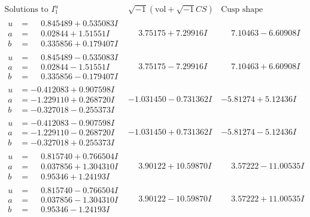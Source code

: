 \documentclass[1p]{elsarticle_modified}
\theoremstyle{definition}
\newcommand{\I}{\sqrt{-1}}
\begin{document}
$$\begin{array}{c|c|c}  
\text{Solutions to }I^u_{1}& \I (\text{vol} + \sqrt{-1}CS) & \text{Cusp shape}\\
 \hline 
\begin{aligned}
u &= \phantom{-}0.845489 + 0.535083 I \\
a &= \phantom{-}0.02844 + 1.51551 I \\
b &= \phantom{-}0.335856 + 0.179407 I\end{aligned}
 & \phantom{-}3.75175 + 7.29916 I & \phantom{-}7.10463 - 6.60908 I \\ \hline\begin{aligned}
u &= \phantom{-}0.845489 - 0.535083 I \\
a &= \phantom{-}0.02844 - 1.51551 I \\
b &= \phantom{-}0.335856 - 0.179407 I\end{aligned}
 & \phantom{-}3.75175 - 7.29916 I & \phantom{-}7.10463 + 6.60908 I \\ \hline\begin{aligned}
u &= -0.412083 + 0.907598 I \\
a &= -1.229110 + 0.268720 I \\
b &= -0.327018 - 0.255373 I\end{aligned}
 & -1.031450 - 0.731362 I & -5.81274 + 5.12436 I \\ \hline\begin{aligned}
u &= -0.412083 - 0.907598 I \\
a &= -1.229110 - 0.268720 I \\
b &= -0.327018 + 0.255373 I\end{aligned}
 & -1.031450 + 0.731362 I & -5.81274 - 5.12436 I \\ \hline\begin{aligned}
u &= \phantom{-}0.815740 + 0.766504 I \\
a &= \phantom{-}0.037856 + 1.304310 I \\
b &= \phantom{-}0.95346 + 1.24193 I\end{aligned}
 & \phantom{-}3.90122 + 10.59870 I & \phantom{-}3.57222 - 11.00535 I \\ \hline\begin{aligned}
u &= \phantom{-}0.815740 - 0.766504 I \\
a &= \phantom{-}0.037856 - 1.304310 I \\
b &= \phantom{-}0.95346 - 1.24193 I\end{aligned}
 & \phantom{-}3.90122 - 10.59870 I & \phantom{-}3.57222 + 11.00535 I \\ \hline\begin{aligned}

\end{aligned}
\end{array}$$
\end{document}
